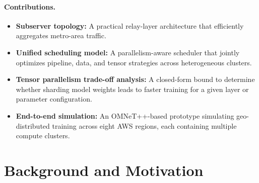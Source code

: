 \documentclass{article}
\begin{document}
\paragraph*{Contributions.} \begin{itemize}\setlength\itemsep{0.2em} \item \textbf{Subserver topology:} A practical relay-layer architecture that efficiently aggregates metro-area traffic. \item \textbf{Unified scheduling model:} A parallelism-aware scheduler that jointly optimizes pipeline, data, and tensor strategies across heterogeneous clusters. \item \textbf{Tensor parallelism trade-off analysis:} A closed-form bound to determine whether sharding model weights leads to faster training for a given layer or parameter configuration. \item \textbf{End-to-end simulation:} An OMNeT++-based prototype simulating geo-distributed training across eight AWS regions, each containing multiple compute clusters. \end{itemize}



\section{Background and Motivation}



\end{document}
